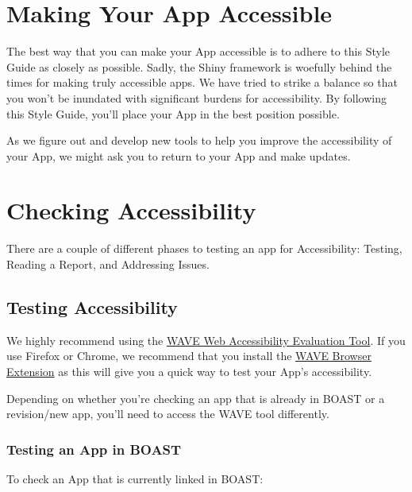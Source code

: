 \documentclass[
]{book}
\begin{document}
\hypertarget{making-your-app-accessible}{%
\section{Making Your App Accessible}\label{making-your-app-accessible}}

The best way that you can make your App accessible is to adhere to this Style Guide as closely as possible. Sadly, the Shiny framework is woefully behind the times for making truly accessible apps. We have tried to strike a balance so that you won't be inundated with significant burdens for accessibility. By following this Style Guide, you'll place your App in the best position possible.

As we figure out and develop new tools to help you improve the accessibility of your App, we might ask you to return to your App and make updates.

\hypertarget{checking-accessibility}{%
\section{Checking Accessibility}\label{checking-accessibility}}

There are a couple of different phases to testing an app for Accessibility: Testing, Reading a Report, and Addressing Issues.

\hypertarget{testing-accessibility}{%
\subsection{Testing Accessibility}\label{testing-accessibility}}

We highly recommend using the \href{https://wave.webaim.org/}{WAVE Web Accessibility Evaluation Tool}. If you use Firefox or Chrome, we recommend that you install the \href{https://wave.webaim.org/extension/}{WAVE Browser Extension} as this will give you a quick way to test your App's accessibility.

Depending on whether you're checking an app that is already in BOAST or a revision/new app, you'll need to access the WAVE tool differently.

\hypertarget{testing-an-app-in-boast}{%
\subsubsection{Testing an App in BOAST}\label{testing-an-app-in-boast}}

To check an App that is currently linked in BOAST:
\end{document}

